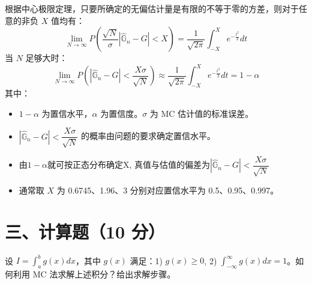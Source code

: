 \documentclass[11pt, a4paper]{article}
\begin{document}
\begin{tcolorbox}[colback=white, colframe=black, title=【解答】（第二章25页）]
根据中心极限定理，只要所确定的无偏估计量是有限的不等于零的方差，则对于任意的非负 $X$ 值均有：
\begin{equation}
    \lim_{N \to \infty} P\left( \frac{\sqrt{N}}{\sigma} \left| \widehat{\mathbb{G}}_n - G \right| < X \right) = \frac{1}{\sqrt{2\pi}} \int_{-X}^{X} e^{-\frac{t^2}{2}} dt
\end{equation}
当 $N$ 足够大时：
\begin{equation}
    \lim_{N \to \infty} P\left( \left| \widehat{\mathbb{G}}_n - G \right| < \frac{X\sigma}{\sqrt{N}} \right) \approx \frac{1}{\sqrt{2\pi}} \int_{-X}^{X} e^{-\frac{t^2}{2}} dt = 1 - \alpha
\end{equation}
其中：
\begin{itemize}
    \item $1 - \alpha$ 为置信水平，$\alpha$ 为置信度。$\sigma$ 为 MC 估计值的标准误差。
    \item $\left| \widehat{\mathbb{G}}_n - G \right| < \dfrac{X\sigma}{\sqrt{N}}$ 的概率由问题的要求确定置信水平。
    \item 由$1 - \alpha$就可按正态分布确定X, 真值与估值的偏差为$\left| \widehat{\mathbb{G}}_n - G \right| < \dfrac{X\sigma}{\sqrt{N}}$
    \item 通常取 $X$ 为 0.6745、1.96、3 分别对应置信水平为 0.5、0.95、0.997。
\end{itemize}
\end{tcolorbox}

\section*{三、计算题（10 分）}
设 $I = \int_a^b g(x) dx$，其中 $g(x)$ 满足：1) $g(x) \geq 0$, 2) $\int_{-\infty}^{\infty} g(x) dx = 1$。如何利用 MC 法求解上述积分？给出求解步骤。
\end{document}
